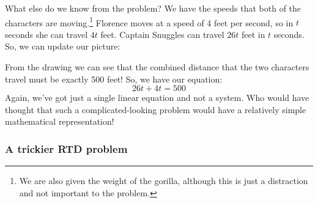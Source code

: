 What else do we know from the problem? We have the speeds that both of the characters are moving.\footnote{We are also given the weight of the gorilla, although this is just a distraction and not important to the problem.} Florence moves at a speed of 4 feet per second, so in $t$ seconds she can travel $4t$ feet. Captain Snuggles can travel $26t$ feet in $t$ seconds. So, we can update our picture:
\begin{center}%
\end{center}%

From the drawing we can see that the combined distance that the two characters travel must be exactly 500 feet! So, we have our equation:
\[26t + 4t = 500\]
Again, we've got just a single linear equation and not a system. Who would have thought that such a complicated-looking problem would have a relatively simple mathematical representation!

%
%
%



\subsubsection{A trickier RTD problem}

